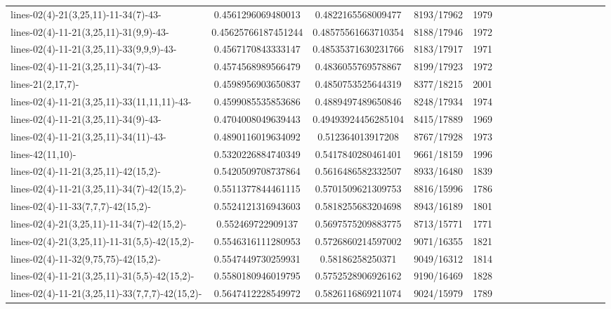 \documentclass[12pt,oneside]{report}			%
\begin{document}
\begin{landscape}
\begin{longtable}{ | p{5cm} | *{15}{c|}}
lines-02(4)-21(3,25,11)-11-34(7)-43-              & 0.4561296069480013  & 0.4822165568009477  & 8193/17962  & 1979 \\
lines-02(4)-11-21(3,25,11)-31(9,9)-43-            & 0.45625766187451244 & 0.48575561663710354 & 8188/17946  & 1972 \\
lines-02(4)-11-21(3,25,11)-33(9,9,9)-43-          & 0.4567170843333147  & 0.48535371630231766 & 8183/17917  & 1971 \\
lines-02(4)-11-21(3,25,11)-34(7)-43-              & 0.4574568989566479  & 0.4836055769578867  & 8199/17923  & 1972 \\
lines-21(2,17,7)-                                 & 0.4598956903650837  & 0.4850753525644319  & 8377/18215  & 2001 \\
lines-02(4)-11-21(3,25,11)-33(11,11,11)-43-        & 0.4599085535853686  & 0.4889497489650846  & 8248/17934  & 1974 \\
lines-02(4)-11-21(3,25,11)-34(9)-43-              & 0.4704008049639443  & 0.49493924456285104 & 8415/17889  & 1969 \\
lines-02(4)-11-21(3,25,11)-34(11)-43-             & 0.4890116019634092  & 0.512364013917208   & 8767/17928  & 1973 \\
lines-42(11,10)-                                  & 0.5320226884740349  & 0.5417840280461401  & 9661/18159  & 1996 \\
lines-02(4)-11-21(3,25,11)-42(15,2)-              & 0.5420509708737864  & 0.5616486582332507  & 8933/16480  & 1839 \\
lines-02(4)-11-21(3,25,11)-34(7)-42(15,2)-        & 0.5511377844461115  & 0.5701509621309753  & 8816/15996  & 1786 \\
lines-02(4)-11-33(7,7,7)-42(15,2)-               & 0.5524121316943603  & 0.5818255683204698  & 8943/16189  & 1801 \\
lines-02(4)-21(3,25,11)-11-34(7)-42(15,2)-        & 0.552469722909137   & 0.5697575209883775  & 8713/15771  & 1771 \\
lines-02(4)-21(3,25,11)-11-31(5,5)-42(15,2)-      & 0.5546316111280953  & 0.5726860214597002  & 9071/16355  & 1821 \\
lines-02(4)-11-32(9,75,75)-42(15,2)-              & 0.5547449730259931  & 0.58186258250371    & 9049/16312  & 1814 \\
lines-02(4)-11-21(3,25,11)-31(5,5)-42(15,2)-      & 0.5580180946019795  & 0.5752528906926162  & 9190/16469  & 1828 \\
lines-02(4)-11-21(3,25,11)-33(7,7,7)-42(15,2)-   & 0.5647412228549972  & 0.5826116869211074  & 9024/15979  & 1789 \\

\end{longtable}
\end{landscape}
\end{document}
